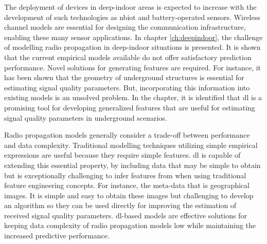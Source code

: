 The deployment of devices in deep-indoor areas is expected to increase with the development of such technologies as \gls{nbiot} and battery-operated sensors. Wireless channel models are essential for designing the communication infrastructure, enabling these many sensor applications. In chapter \ref{ch:deepindoor}, the challenge of modelling radio propagation in deep-indoor situations is presented. It is shown that the current empirical models available do not offer satisfactory prediction performance. Novel solutions for generating features are required. For instance, it has been shown that the geometry of underground structures is essential for estimating signal quality parameters. But, incorporating this information into existing models is an unsolved problem. In the chapter, it is identified that \gls{dl} is a promising tool for developing generalized features that are useful for estimating signal quality parameters in underground scenarios.

Radio propagation models generally consider a trade-off between performance and data complexity. Traditional modelling techniques utilizing simple empirical expressions are useful because they require simple features. \gls{dl} is capable of extending this essential property, by including data that may be simple to obtain but is exceptionally challenging to infer features from when using traditional feature engineering concepts. For instance, the meta-data that is geographical images. It is simple and easy to obtain these images but challenging to develop an algorithm so they can be used directly for improving the estimation of received signal quality parameters. \gls{dl}-based models are effective solutions for keeping data complexity of radio propagation models low while maintaining the increased predictive performance.
